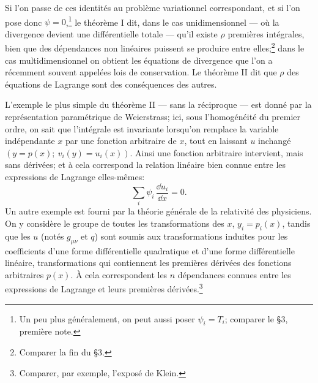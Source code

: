 Si l'on passe de ces identités au problème variationnel correspondant, et si l'on pose donc \(\psi=0\),\footnote{Un peu plus généralement, on peut aussi poser \(\psi_i=T_i\); comparer le \S{}3, première note.} le théorème I dit, dans le cas unidimensionnel --- où la divergence devient une différentielle totale --- qu'il existe \(\rho\) premières intégrales, bien que des dépendances non linéaires puissent se produire entre elles;\footnote{Comparer la fin du \S{}3.} dans le cas multidimensionnel on obtient les équations de divergence que l'on a récemment souvent appelées \og{}lois de conservation\fg{}. Le théorème II dit que \(\rho\) des équations de Lagrange sont des conséquences des autres.

L'exemple le plus simple du théorème II --- sans la réciproque --- est donné par la représentation paramétrique de Weierstrass; ici, sous l'homogénéité du premier ordre, on sait que l'intégrale est invariante lorsqu'on remplace la variable indépendante \(x\) par une fonction arbitraire de \(x\), tout en laissant \(u\) inchangé \((y=p(x);\ v_i(y)=u_i(x))\). Ainsi une fonction arbitraire intervient, mais sans dérivées; et à cela correspond la relation linéaire bien connue entre les expressions de Lagrange elles-mêmes:
\[
\sum_i \psi_i\,\frac{\dd u_i}{\dd x}=0.
\]
Un autre exemple est fourni par la \og{}théorie générale de la relativité\fg{} des physiciens. On y considère le groupe de toutes les transformations des \(x\), \(y_i=p_i(x)\), tandis que les \(u\) (notés \(g_{\mu\nu}\) et \(q\)) sont soumis aux transformations induites pour les coefficients d'une forme différentielle quadratique et d'une forme différentielle linéaire, transformations qui contiennent les premières dérivées des fonctions arbitraires \(p(x)\). À cela correspondent les \(n\) dépendances connues entre les expressions de Lagrange et leurs premières dérivées.\footnote{Comparer, par exemple, l'exposé de Klein.}

